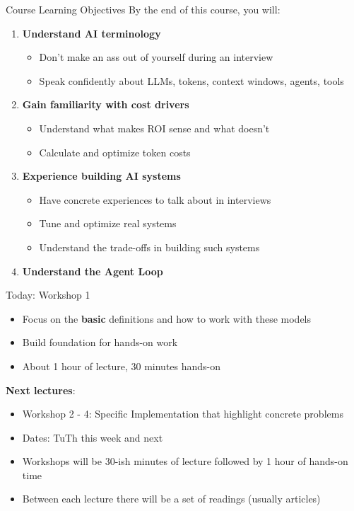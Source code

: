 \documentclass[aspectratio=169]{beamer}
\begin{document}
\begin{frame}{Course Learning Objectives}
By the end of this course, you will:
\begin{enumerate}
    \item \textbf{Understand AI terminology}
    \begin{itemize}
        \item Don't make an ass out of yourself during an interview
        \item Speak confidently about LLMs, tokens, context windows, agents, tools
    \end{itemize}
    \item \textbf{Gain familiarity with cost drivers}
    \begin{itemize}
        \item Understand what makes ROI sense and what doesn't
        \item Calculate and optimize token costs
    \end{itemize}
    \item \textbf{Experience building AI systems}
    \begin{itemize}
        \item Have concrete experiences to talk about in interviews
        \item Tune and optimize real systems
        \item Understand the trade-offs in building such systems
    \end{itemize}
    \item \textbf{Understand the Agent Loop}
\end{enumerate}
\end{frame}

\begin{frame}{Today: Workshop 1}
\begin{itemize}
    \item Focus on the \textbf{basic} definitions and how to work with these models
    \item Build foundation for hands-on work
    \item About 1 hour of lecture, 30 minutes hands-on
\end{itemize}
\vspace{0.5cm}
\textbf{Next lectures}:
\begin{itemize}
    \item Workshop 2 - 4: Specific Implementation that highlight concrete problems
    \item Dates: TuTh this week and next
    \item Workshops will be 30-ish minutes of lecture followed by 1 hour of hands-on time
    \item Between each lecture there will be a set of readings (usually articles)
\end{itemize}
\end{frame}
\end{document}
